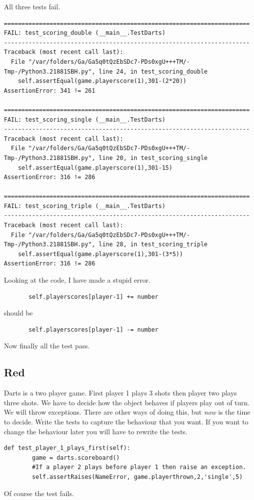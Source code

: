 \documentclass{paper}
\begin{document}
All three tests fail.
\begin{verbatim}
======================================================================
FAIL: test_scoring_double (__main__.TestDarts)
----------------------------------------------------------------------
Traceback (most recent call last):
  File "/var/folders/Ga/Ga5q0tQzEbSDc7-PDs0xgU+++TM/-Tmp-/Python3.21881SBH.py", line 24, in test_scoring_double
    self.assertEqual(game.playerscore(1),301-(2*20))
AssertionError: 341 != 261

======================================================================
FAIL: test_scoring_single (__main__.TestDarts)
----------------------------------------------------------------------
Traceback (most recent call last):
  File "/var/folders/Ga/Ga5q0tQzEbSDc7-PDs0xgU+++TM/-Tmp-/Python3.21881SBH.py", line 20, in test_scoring_single
    self.assertEqual(game.playerscore(1),301-15)
AssertionError: 316 != 286

======================================================================
FAIL: test_scoring_triple (__main__.TestDarts)
----------------------------------------------------------------------
Traceback (most recent call last):
  File "/var/folders/Ga/Ga5q0tQzEbSDc7-PDs0xgU+++TM/-Tmp-/Python3.21881SBH.py", line 28, in test_scoring_triple
    self.assertEqual(game.playerscore(1),301-(3*5))
AssertionError: 316 != 286
\end{verbatim}
Looking at the code, I have made a stupid error.
\begin{lstlisting}
       self.playerscores[player-1] += number
\end{lstlisting}
should be
\begin{lstlisting}
       self.playerscores[player-1] -= number
\end{lstlisting}
Now finally all the test pass.
\subsection{Red}

Darts is a two player game. First player 1 plays 3 shots then player
two plays three shots. We have to decide how the object behaves if
players play out of turn. We will throw exceptions. There are other ways
of doing this, but {\em now} is the time to decide. Write the tests to
capture the behaviour that you want. If you want to change the
behaviour later you will have to rewrite the tests.

\begin{lstlisting}
def test_player_1_plays_first(self):
        game = darts.scoreboard()
        #If a player 2 plays before player 1 then raise an exception.
        self.assertRaises(NameError, game.playerthrown,2,'single',5)   
\end{lstlisting}
Of course the test fails.
\end{document}
